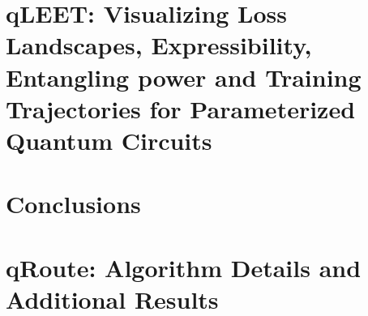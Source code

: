 \documentclass[11pt]{book}
\begin{document}

\chapter{qLEET: Visualizing Loss Landscapes, Expressibility, Entangling power and Training Trajectories for Parameterized Quantum Circuits}
\label{ch:qleet}



\chapter{Conclusions}
\label{ch:conc}



\appendix
\chapter{qRoute: Algorithm Details and Additional Results}
\label{ch:appendix-qroute}


% 



 
\end{document}
